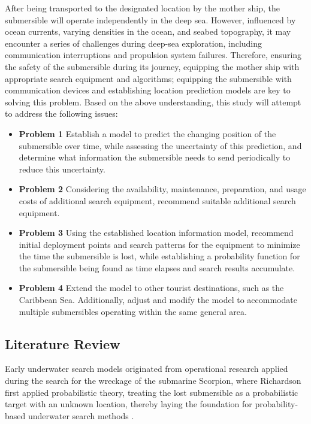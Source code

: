 \documentclass{mcmthesis}
\begin{document}
After being transported to the designated location by the mother ship, the submersible will operate independently in the deep sea.
However, influenced by ocean currents, varying densities in the ocean, and seabed topography, it may encounter a series of challenges during deep-sea exploration, including communication interruptions and propulsion system failures.
Therefore, ensuring the safety of the submersible during its journey, equipping the mother ship with appropriate search equipment and algorithms;
equipping the submersible with communication devices and establishing location prediction models are key to solving this problem.
Based on the above understanding, this study will attempt to address the following issues:
\begin{itemize}
  \item \textbf{Problem 1} Establish a model to predict the changing position of the submersible over time, while assessing the uncertainty of this prediction,
        and determine what information the submersible needs to send periodically to reduce this uncertainty.
  \item \textbf{Problem 2} Considering the availability, maintenance, preparation, and usage costs of additional search equipment, recommend suitable additional search equipment.
  \item \textbf{Problem 3} Using the established location information model, recommend initial deployment points and search patterns for the equipment to minimize the time the submersible is lost, while
       establishing a probability function for the submersible being found as time elapses and search results accumulate.
  \item \textbf{Problem 4} Extend the model to other tourist destinations, such as the Caribbean Sea.
  Additionally, adjust and modify the model to accommodate multiple submersibles operating within the same general area.
\end{itemize}



\subsection{Literature Review}
Early underwater search models originated from operational research applied during the search for the wreckage of the submarine Scorpion, 
where Richardson first applied probabilistic theory, treating the lost submersible as a probabilistic target with an unknown location, thereby laying the foundation for probability-based underwater search methods \cite{SCORPION}.
\end{document}
